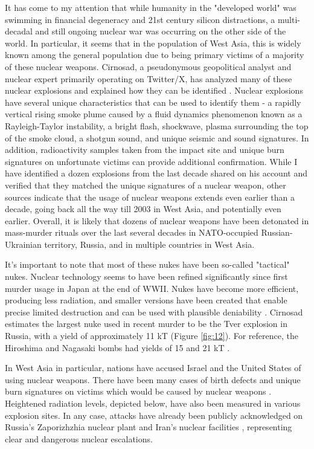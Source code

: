 \documentclass[10pt,twocolumn,letterpaper]{article}
\begin{document}
It has come to my attention that while humanity in the "developed world" was swimming in financial degeneracy and 21st century silicon distractions, a multi-decadal and still ongoing nuclear war was occurring on the other side of the world. In particular, it seems that in the population of West Asia, this is widely known among the general population due to being primary victims of a majority of these nuclear weapons. Cirnosad, a pseudonymous geopolitical analyst and nuclear expert primarily operating on Twitter/X, has analyzed many of these nuclear explosions and explained how they can be identified \cite{24}. Nuclear explosions have several unique characteristics that can be used to identify them - a rapidly vertical rising smoke plume caused by a fluid dynamics phenomenon known as a Rayleigh-Taylor instability, a bright flash, shockwave, plasma surrounding the top of the smoke cloud, a shotgun sound, and unique seismic and sound signatures. In addition, radioactivity samples taken from the impact site and unique burn signatures on unfortunate victims can provide additional confirmation. While I have identified a dozen explosions from the last decade shared on his account and verified that they matched the unique signatures of a nuclear weapon, other sources indicate that the usage of nuclear weapons extends even earlier than a decade, going back all the way till 2003 in West Asia, and potentially even earlier. Overall, it is likely that dozens of nuclear weapons have been detonated in mass-murder rituals over the last several decades in NATO-occupied Russian-Ukrainian territory, Russia, and in multiple countries in West Asia.

It's important to note that most of these nukes have been so-called "tactical" nukes. Nuclear technology seems to have been refined significantly since first murder usage in Japan at the end of WWII. Nukes have become more efficient, producing less radiation, and smaller versions have been created that enable precise limited destruction and can be used with plausible deniability \cite{29}. Cirnosad estimates the largest nuke used in recent murder to be the Tver explosion in Russia, with a yield of approximately 11 kT \cite{24} (Figure \ref{fig:12}). For reference, the Hiroshima and Nagasaki bombs had yields of 15 and 21 kT \cite{30}.

In West Asia in particular, nations have accused Israel and the United States of using nuclear weapons. There have been many cases of birth defects \cite{26,27} and unique burn signatures on victims which would be caused by nuclear weapons \cite{28}. Heightened radiation levels, depicted below, have also been measured in various explosion sites. In any case, attacks have already been publicly acknowledged on Russia's Zaporizhzhia nuclear plant \cite{60} and Iran's nuclear facilities \cite{61}, representing clear and dangerous nuclear escalations.
\end{document}
